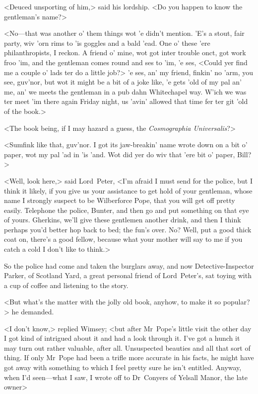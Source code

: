 <Deuced unsporting of him,> said his lordship. <Do you happen to know the gentleman's name?>

<No—that was another o' them things wot 'e didn't mention. 'E's a stout, fair party, wiv 'orn rims to 'is goggles and a bald 'ead. One o' these 'ere philanthropists, I reckon. A friend o' mine, wot got inter trouble onct, got work froo 'im, and the gentleman comes round and ses to 'im, 'e ses, <Could yer find me a couple o' lads ter do a little job?> 'e ses, an' my friend, finkin' no 'arm, you see, guv'nor, but wot it might be a bit of a joke like, 'e gets 'old of my pal an' me, an' we meets the gentleman in a pub dahn Whitechapel way. W'ich we was ter meet 'im there again Friday night, us 'avin' allowed that time fer ter git 'old of the book.>

<The book being, if I may hazard a guess, the \textit{Cosmographia Universalis}?>

<Sumfink like that, guv'nor. I got its jaw-breakin' name wrote down on a bit o' paper, wot my pal 'ad in 'is 'and. Wot did yer do wiv that 'ere bit o' paper, Bill?>

<Well, look here,> said Lord~Peter, <I'm afraid I must send for the police, but I think it likely, if you give us your assistance to get hold of your gentleman, whose name I strongly suspect to be Wilberforce Pope, that you will get off pretty easily. Telephone the police, Bunter, and then go and put something on that eye of yours. Gherkins, we'll give these gentlemen another drink, and then I think perhaps you'd better hop back to bed; the fun's over. No? Well, put a good thick coat on, there's a good fellow, because what your mother will say to me if you catch a cold I don't like to think.>

So the police had come and taken the burglars away, and now Detective-Inspector Parker, of Scotland Yard, a great personal friend of Lord~Peter's, sat toying with a cup of coffee and listening to the story.

<But what's the matter with the jolly old book, anyhow, to make it so popular?> he demanded.

<I don't know,> replied Wimsey; <but after Mr~Pope's little visit the other day I got kind of intrigued about it and had a look through it. I've got a hunch it may turn out rather valuable, after all. Unsuspected beauties and all that sort of thing. If only Mr~Pope had been a trifle more accurate in his facts, he might have got away with something to which I feel pretty sure he isn't entitled. Anyway, when I'd seen—what I saw, I wrote off to Dr~Conyers of Yelsall Manor, the late owner\longdash>

